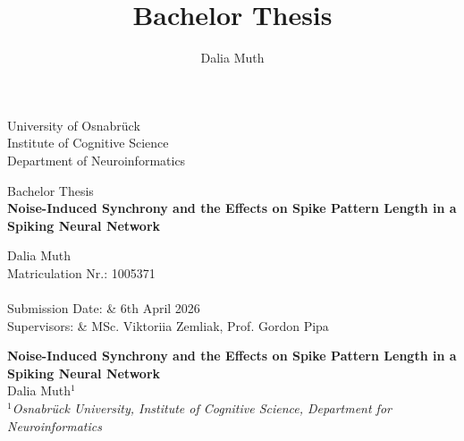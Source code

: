 \documentclass[12pt,a4paper]{article}
\author{Dalia Muth}
\title{Bachelor Thesis}
\begin{document}
    \begin{center}
    \thispagestyle{empty}
    \vspace*{3cm}
    \LARGE{University of Osnabrück}\\[0.25ex]
    \LARGE{Institute of Cognitive Science}\\[1.5ex]
    \large{Department of Neuroinformatics}\\
    \vspace*{0.3cm}
    \vspace*{2cm}
    \medskip\par
    \Large{Bachelor Thesis}\\
    \vspace*{1.5cm}
    \Large{\textbf{Noise-Induced Synchrony and the Effects on Spike Pattern Length in a Spiking Neural Network}}\\
    \vspace*{1.5cm}
    \bigskip\par
    \large{Dalia Muth}\\[0.5ex]
    \large{Matriculation Nr.: 1005371}\\ [5ex]
    \vspace*{2cm}
    \\[1ex]
    \large{Submission Date:  & 6th April 2026}\\[0.5ex]
    \large{Supervisors: & MSc. Viktoriia Zemliak, Prof. Gordon Pipa}\\ [5ex]
    \end{center}

    \newpage
    \tableofcontents
	
    \newpage
	\begin{figure}[H]
		\raggedright
	\end{figure}

	\vspace{7.5mm}
	
	\begin{center}
		{\Large \textbf{Noise-Induced Synchrony and the Effects on Spike Pattern Length in a Spiking Neural Network}}\\
		\vspace{2mm}
		{\large Dalia Muth$^{1}$}\\
		\vspace{7.5mm}
		$^1$\textit{Osnabrück University, Institute of Cognitive Science, Department for Neuroinformatics} \\
	\end{center}
\end{document}
